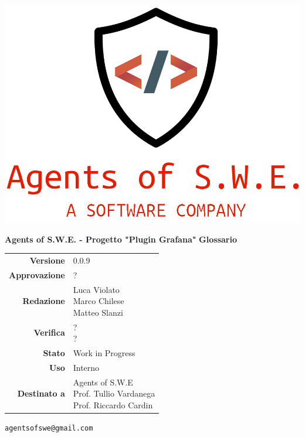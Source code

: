 



\begin{titlepage}
\thispagestyle{empty}

\begin{center}

\includegraphics[scale=0.3]{./images/logo.png} 

\large \textbf{Agents of S.W.E. - Progetto "Plugin Grafana"}
\vfill
\Huge \textbf{Glossario}
\vfill
\large
\renewcommand{\arraystretch}{1.3}
\begin{tabular}{r|l}
\textbf{Versione} & 0.0.9\\
\textbf{Approvazione} & ?\\
\textbf{Redazione} & \parbox[t]{5cm}{Luca Violato\\Marco Chilese\\Matteo Slanzi}\\
\textbf{Verifica} & \parbox[t]{5cm}{?\\?}\\
\textbf{Stato} & Work in Progress\\
\textbf{Uso} & Interno\\
\textbf{Destinato a} & \parbox[t]{5cm}{Agents of S.W.E \\Prof. Tullio Vardanega\\Prof. Riccardo Cardin}
\end{tabular}
\vfill
\small
\texttt{agentsofswe@gmail.com}
\end{center}
\end{titlepage}

\pagebreak

